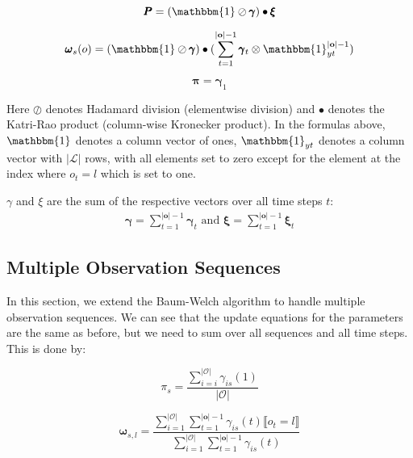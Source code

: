 \begin{equation}
    \pmb{P}
    = (\mathbbm{1} \oslash \pmb{\gamma}) \bullet \pmb{\xi}
    \label{eq:transition-probabilities-multiple-sequences}
\end{equation}

\begin{equation}
    \pmb{\omega}
    _s(o) = (\mathbbm{1} \oslash \pmb{\gamma}) \bullet (\sum_{t=1}^{|\mathbf{o}|-1} \pmb{\gamma}_t \otimes \mathbbm{1}_{yt}^{|\mathbf{o}|-1})
    \label{eq:omega-multiple-sequences}
\end{equation}

\begin{equation}
    \pmb{\pi}
    = \pmb{\gamma}_1
    \label{eq:initial-probabilities-multiple-sequences}
\end{equation}

Here $\oslash$ denotes Hadamard division (elementwise division) and $\bullet$ denotes the Katri-Rao product (column-wise Kronecker product).
In the formulas above, $\mathbbm{1}$ denotes a column vector of ones, $\mathbbm{1}_{yt}$ denotes a column vector with $|\mathcal{L}|$ rows, with all elements set to zero except for the element at the index where $o_t = l$ which is set to one.

$\gamma$ and $\xi$ are the sum of the respective vectors over all time steps $t$:
\begin{align}
    \pmb{\gamma} = \sum_{t=1}^{|\mathbf{o}|-1} \pmb{\gamma}_t
    \text{ and }
    \pmb{\xi} = \sum_{t=1}^{|\mathbf{o}|-1} \pmb{\xi}_t
\end{align}


\subsection{Multiple Observation Sequences}\label{subsec:multiple-observation-sequences}
In this section, we extend the Baum-Welch algorithm to handle multiple observation sequences.
We can see that the update equations for the parameters are the same as before, but we need to sum over all sequences and all time steps.
This is done by:


\begin{equation}
    \pi_s = \frac{\sum_{i=i}^{|\mathcal{O}|} \gamma_{is}(1) }{|\mathcal{O}|}
\end{equation}

\begin{equation}
    \pmb{\omega}_{s, l} = \frac{\sum_{i=1}^{|\mathcal{O}|} \sum_{t=1}^{|\mathbf{o}|-1} \gamma_{is}(t) \lBrack o_t = l \rBrack}{\sum_{i=1}^{|\mathcal{O}|} \sum_{t=1}^{|\mathbf{o}|-1} \gamma_{is}(t)}
\end{equation}

